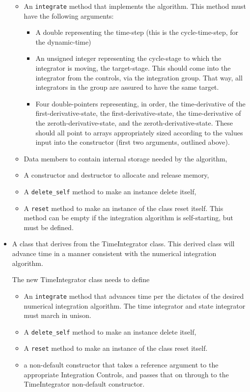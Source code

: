 \begin{itemize}
\begin{itemize}
\item An \verb+integrate+ method that implements the algorithm.  This method 
must have the following arguments:
\begin{itemize}
 \item A double representing the time-step (this is the cycle-time-step, for 
 the dynamic-time)
 \item An unsigned integer representing the cycle-stage to which the 
 integrator is moving, the target-stage.  This should come into the integrator 
 from the controls, via the integration group.  That way, all integrators in 
 the group are assured to have the same target.
 \item Four double-pointers representing, in order, the time-derivative of the 
 first-derivative-state, the first-derivative-state, the time-derivative of 
 the zeroth-derivative-state, and the zeroth-derivative-state.  These should 
 all point to arrays appropriately sized according to the values input into 
 the constructor (first two arguments, outlined above).
\end{itemize} 

\item Data members to contain internal storage needed by the algorithm,
\item A constructor and destructor to allocate and release memory,
\item A \verb+delete_self+ method to make an instance delete itself,
\item A \verb+reset+ method to make an instance of the class reset itself.  
This method can be empty if the integration algorithm is self-starting, but 
must be defined.

\end{itemize}


\item A class that derives from the TimeIntegrator class.
This derived class will advance time in a manner consistent with the
numerical integration algorithm.

The new TimeIntegrator class needs to define
\begin{itemize}
\item An \verb+integrate+ method that advances time per the dictates of the
desired numerical integration algorithm.
The time integrator and state integrator must march in unison.
\item A \verb+delete_self+ method to make an instance delete itself,
\item A \verb+reset+ method to make an instance of the class reset itself.
\item a non-default constructor that takes a reference argument to the 
appropriate Integration Controls, and passes that on through to the 
TimeIntegrator non-default constructor.
\end{itemize}


\end{itemize}
